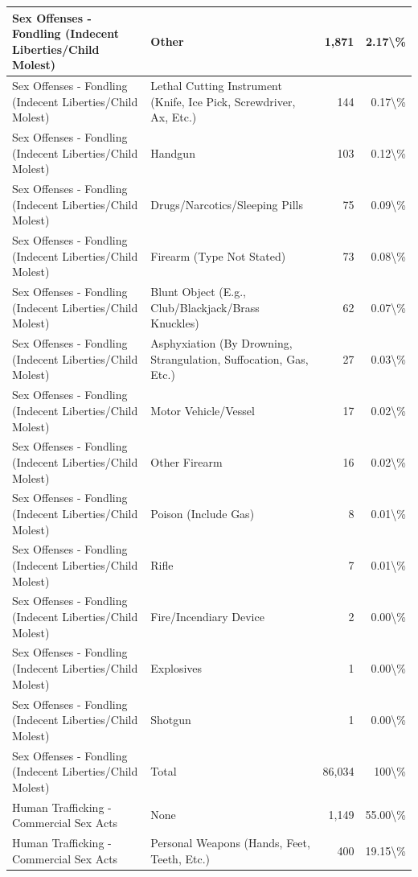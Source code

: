 \documentclass[
]{krantz}
\begin{document}
\begin{longtable}[t]{l|l|r|r}
\hline
Sex Offenses - Fondling (Indecent Liberties/Child Molest) & Other & 1,871 & 2.17\textbackslash{}\%\\
\hline
Sex Offenses - Fondling (Indecent Liberties/Child Molest) & Lethal Cutting Instrument (Knife, Ice Pick, Screwdriver, Ax, Etc.) & 144 & 0.17\textbackslash{}\%\\
\hline
Sex Offenses - Fondling (Indecent Liberties/Child Molest) & Handgun & 103 & 0.12\textbackslash{}\%\\
\hline
Sex Offenses - Fondling (Indecent Liberties/Child Molest) & Drugs/Narcotics/Sleeping Pills & 75 & 0.09\textbackslash{}\%\\
\hline
Sex Offenses - Fondling (Indecent Liberties/Child Molest) & Firearm (Type Not Stated) & 73 & 0.08\textbackslash{}\%\\
\hline
Sex Offenses - Fondling (Indecent Liberties/Child Molest) & Blunt Object (E.g., Club/Blackjack/Brass Knuckles) & 62 & 0.07\textbackslash{}\%\\
\hline
Sex Offenses - Fondling (Indecent Liberties/Child Molest) & Asphyxiation (By Drowning, Strangulation, Suffocation, Gas, Etc.) & 27 & 0.03\textbackslash{}\%\\
\hline
Sex Offenses - Fondling (Indecent Liberties/Child Molest) & Motor Vehicle/Vessel & 17 & 0.02\textbackslash{}\%\\
\hline
Sex Offenses - Fondling (Indecent Liberties/Child Molest) & Other Firearm & 16 & 0.02\textbackslash{}\%\\
\hline
Sex Offenses - Fondling (Indecent Liberties/Child Molest) & Poison (Include Gas) & 8 & 0.01\textbackslash{}\%\\
\hline
Sex Offenses - Fondling (Indecent Liberties/Child Molest) & Rifle & 7 & 0.01\textbackslash{}\%\\
\hline
Sex Offenses - Fondling (Indecent Liberties/Child Molest) & Fire/Incendiary Device & 2 & 0.00\textbackslash{}\%\\
\hline
Sex Offenses - Fondling (Indecent Liberties/Child Molest) & Explosives & 1 & 0.00\textbackslash{}\%\\
\hline
Sex Offenses - Fondling (Indecent Liberties/Child Molest) & Shotgun & 1 & 0.00\textbackslash{}\%\\
\hline
Sex Offenses - Fondling (Indecent Liberties/Child Molest) & Total & 86,034 & 100\textbackslash{}\%\\
\hline
Human Trafficking - Commercial Sex Acts & None & 1,149 & 55.00\textbackslash{}\%\\
\hline
Human Trafficking - Commercial Sex Acts & Personal Weapons (Hands, Feet, Teeth, Etc.) & 400 & 19.15\textbackslash{}\%\\

\end{longtable}
\end{document}
